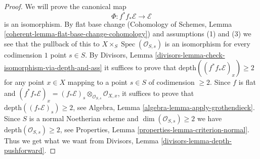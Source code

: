 \documentclass[10pt,a4paper]{amsart}
\theoremstyle{plain}
\theoremstyle{definition}
\theoremstyle{remark}
\numberwithin{equation}{subsection}
\def\Spec{\mathop{\mathrm{Spec}}}
\begin{document}
\begin{proof}
We will prove the canonical map
$$
\Phi : f^*f_*\mathcal{E} \longrightarrow \mathcal{E}
$$
is an isomorphism. By flat base change (Cohomology of Schemes, Lemma
\ref{coherent-lemma-flat-base-change-cohomology})
and assumptions (1) and (3) we see that
the pullback of this to $X \times_S \Spec(\mathcal{O}_{S, s})$
is an isomorphism for every codimension $1$ point $s \in S$.
By Divisors, Lemma \ref{divisors-lemma-check-isomorphism-via-depth-and-ass}
it suffices to prove that $\text{depth}((f^*f_*\mathcal{E})_x) \geq 2$
for any point $x \in X$ mapping to a point $s \in S$ of codimension $\geq 2$.
Since $f$ is flat and
$(f^*f_*\mathcal{E})_x = (f_*\mathcal{E})_s \otimes_{\mathcal{O}_{S, s}}
\mathcal{O}_{X, x}$, it suffices to prove that
$\text{depth}((f_*\mathcal{E})_s) \geq 2$, see
Algebra, Lemma \ref{algebra-lemma-apply-grothendieck}.
Since $S$ is a normal Noetherian scheme
and $\dim(\mathcal{O}_{S, s}) \geq 2$
we have $\text{depth}(\mathcal{O}_{S, s}) \geq 2$, see
Properties, Lemma \ref{properties-lemma-criterion-normal}.
Thus we get what we want from
Divisors, Lemma \ref{divisors-lemma-depth-pushforward}.
\end{proof}
\end{document}
